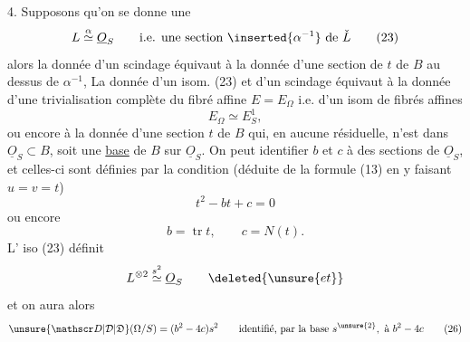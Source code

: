 4. Supposons qu'on se donne une 
\[
L\overset{\alpha}{\simeq}\underline{O}_S\qquad\text{i.e. une section }\inserted{\alpha^{-1}}\text{ de }\check L \tag*{(23)}
\]
alors la donnée d'un scindage équivaut
à la donnée d'une section de $t$ de $B$ au
dessus de $\alpha^{-1}$, La donnée d'un isom. (23)
et d'un scindage équivaut à la donnée d'une
trivialisation complète du fibré affine $E=E_\Omega$
i.e. d'un isom de fibrés affines
\[
E_\Omega\simeq E^1_S,
\]
ou encore à la donnée d'une section
$t$ de $B$ qui, en aucune  résiduelle,
n'est dans $\underline{O}_S\subset B$, 
soit une \uline{base} de $B$ sur $\underline{O}_S$. On peut  identifier
$b$ et $c$ à des sections de $\underline{O}_S$, et celles-ci
sont définies par la condition (déduite de la
 formule (13) en y faisant $u=v=t$)
\[
t^2-bt+c=0 \tag*{(24)}
\]
ou encore
\[
b=\operatorname{tr}t,\qquad c=N(t).\tag*{(25)}
\]
L' iso (23) définit 
\[
 L^{\otimes2}\overset{s^2}{\simeq}\underline{O}_S\qquad\deleted{\unsure{et}}
\]
et  on aura alors
\[
\unsure{\mathscr D|\mathcal D|\mathfrak D}(\Omega/S)=(b^2-4c)s^2\qquad
\text{identifié, par la base }s^{\unsure{2}},\text{ à }b^2-4c \tag*{(26)}
\]


